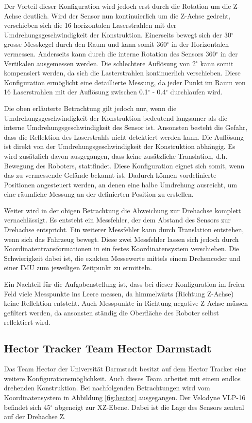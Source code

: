 Der Vorteil dieser Konfiguration wird jedoch erst durch die Rotation um die Z-Achse deutlich. Wird der Sensor nun kontinuierlich um die Z-Achse gedreht, verschieben sich die 16 horizontalen Laserstrahlen mit der Umdrehungsgeschwindigkeit der Konstruktion. Einerseits bewegt sich der 30$^\circ$ grosse Messkegel durch den Raum und kann somit 360$^\circ$ in der Horizontalen vermessen. Anderseits kann durch die interne Rotation des Sensors 360$^\circ$  in der Vertikalen ausgemessen werden. Die schlechtere Auflösung von 2$^\circ$ kann somit kompensiert werden, da sich die Lasterstrahlen kontinuerlich verschieben. Diese Konfiguration ermöglicht eine detaillierte Messung, da jeder Punkt im Raum von 16 Laserstrahlen mit der Auflösung zwischen 0.1$^\circ$ - 0.4$^\circ$ durchlaufen wird. 

Die oben erläuterte Betrachtung gilt jedoch nur, wenn die Umdrehungsgeschwindigkeit der Konstruktion bedeutend langsamer als die interne Umdrehungsgeschwindigkeit des Sensor ist. Ansonsten besteht die Gefahr, dass die Reflektion des Laserstrahls nicht detektiert werden kann. Die Auflösung ist direkt von der Umdrehungsgeschwindigkeit der Konstruktion abhängig. Es wird zusätzlich davon ausgegangen, dass keine zusätzliche Translation, d.h. Bewegung des Roboters, stattfindet. Diese Konfiguration eignet sich somit, wenn das zu vermessende Gelände bekannt ist. Dadurch können vordefinierte Positionen angesteuert werden, an denen eine halbe Umdrehung ausreicht, um eine räumliche Messung an der definierten Position zu erstellen. 

Weiter wird in der obigen Betrachtung die Abweichung zur Drehachse komplett vernachlässigt. Es entsteht ein Messfehler, der dem Abstand des Sensors zur Drehachse entspricht. Ein weiterer Messfehler kann durch Translation entstehen, wenn sich das Fahrzeug bewegt. Diese zwei Messfehler lassen sich jedoch durch Koordinatentransformationen in ein festes Koordinatensystem verschieben. Die Schwierigkeit dabei ist, die exakten Messewerte mittels einem Drehencoder und einer \ac{IMU} zum jeweiligen Zeitpunkt zu ermitteln. 

Ein Nachteil für die Aufgabenstellung ist, dass bei dieser Konfiguration im freien Feld viele Messpunkte ins Leere messen, da himmelwärts (Richtung Z-Achse) keine Reflektion entsteht. Auch Messpunkte in Richtung negative Z-Achse müssen gefiltert werden, da ansonsten ständig die Oberfläche des Roboter selbst reflektiert wird.

\subsection{Hector Tracker Team Hector Darmstadt}
 \label{subsec:hector}
Das Team Hector der Universität Darmstadt besitzt auf dem Hector Tracker eine weitere Konfigurationsmöglichkeit. Auch dieses Team arbeitet mit einem endlos drehenden Konstruktion. Bei nachfolgenden Betrachtungen wird vom Koordinatensystem in Abbildung \ref{fig:hector} ausgegangen. Der Velodyne VLP-16 befindet sich 45$^\circ$ abgeneigt zur XZ-Ebene. Dabei ist die Lage des Sensors zentral auf der Drehachse Z.

